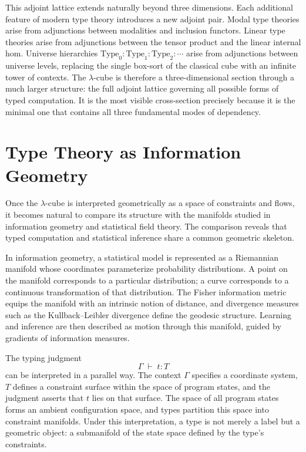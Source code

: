 \documentclass[12pt,a4paper]{article}
\theoremstyle{plain}
\theoremstyle{definition}
\newcommand{\Type}{\mathrm{Type}}
\begin{document}
This adjoint lattice extends naturally beyond three dimensions. Each additional feature of modern type theory introduces a new adjoint pair. Modal type theories arise from adjunctions between modalities and inclusion functors. Linear type theories arise from adjunctions between the tensor product and the linear internal hom. Universe hierarchies $\Type_0 : \Type_1 : \Type_2 : \cdots$ arise from adjunctions between universe levels, replacing the single box-sort of the classical cube with an infinite tower of contexts. The $\lambda$-cube is therefore a three-dimensional section through a much larger structure: the full adjoint lattice governing all possible forms of typed computation. It is the most visible cross-section precisely because it is the minimal one that contains all three fundamental modes of dependency.

\section{Type Theory as Information Geometry}

Once the $\lambda$-cube is interpreted geometrically as a space of constraints and flows, it becomes natural to compare its structure with the manifolds studied in information geometry and statistical field theory. The comparison reveals that typed computation and statistical inference share a common geometric skeleton.

In information geometry, a statistical model is represented as a Riemannian manifold whose coordinates parameterize probability distributions. A point on the manifold corresponds to a particular distribution; a curve corresponds to a continuous transformation of that distribution. The Fisher information metric equips the manifold with an intrinsic notion of distance, and divergence measures such as the Kullback--Leibler divergence define the geodesic structure. Learning and inference are then described as motion through this manifold, guided by gradients of information measures.

The typing judgment
\[
\Gamma \;\vdash\; t : T
\]
can be interpreted in a parallel way. The context $\Gamma$ specifies a coordinate system, $T$ defines a constraint surface within the space of program states, and the judgment asserts that $t$ lies on that surface. The space of all program states forms an ambient configuration space, and types partition this space into constraint manifolds. Under this interpretation, a type is not merely a label but a geometric object: a submanifold of the state space defined by the type's constraints.
\end{document}
